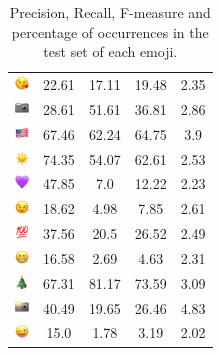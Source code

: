 \documentclass{article}
\begin{document}
\begin{table}
\begin{tabular}{|c|ccc|c|}
\includegraphics[height=0.37cm,width=0.37cm]{img/face_blowing_a_kiss.png} & 22.61 & 17.11 & 19.48 & 2.35\\ 
\includegraphics[height=0.37cm,width=0.37cm]{img/camera.png} & 28.61 & 51.61 & 36.81 & 2.86\\ 
\includegraphics[height=0.37cm,width=0.37cm]{img/United_States.png} & 67.46 & 62.24 & 64.75 & 3.9\\ 
\includegraphics[height=0.37cm,width=0.37cm]{img/sun.png} & 74.35 & 54.07 & 62.61 & 2.53\\ 
\includegraphics[height=0.37cm,width=0.37cm]{img/purple_heart.png} & 47.85 & 7.0 & 12.22 & 2.23\\ 
\includegraphics[height=0.37cm,width=0.37cm]{img/winking_face.png} & 18.62 & 4.98 & 7.85 & 2.61\\ 
\includegraphics[height=0.37cm,width=0.37cm]{img/hundred_points.png} & 37.56 & 20.5 & 26.52 & 2.49\\ 
\includegraphics[height=0.37cm,width=0.37cm]{img/beaming_face_with_smiling_eyes.png} & 16.58 & 2.69 & 4.63 & 2.31\\ 
\includegraphics[height=0.37cm,width=0.37cm]{img/Christmas_tree.png} & 67.31 & 81.17 & 73.59 & 3.09\\ 
\includegraphics[height=0.37cm,width=0.37cm]{img/camera_with_flash.png} & 40.49 & 19.65 & 26.46 & 4.83\\ 
\includegraphics[height=0.37cm,width=0.37cm]{img/winking_face_with_tongue.png} & 15.0 & 1.78 & 3.19 & 2.02\\ 

\hline
\end{tabular}
\caption{\label{table:emoji_detailed} Precision, Recall, F-measure and percentage of occurrences in the test set of each emoji.}
\end{table}
\end{document}

